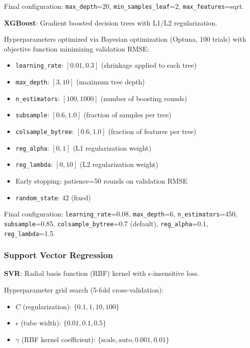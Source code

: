 \documentclass[11pt]{article}
\begin{document}
Final configuration: \texttt{max\_depth}=20, \texttt{min\_samples\_leaf}=2, \texttt{max\_features}=sqrt.

\textbf{XGBoost}: Gradient boosted decision trees with L1/L2 regularization.

Hyperparameters optimized via Bayesian optimization (Optuna, 100 trials) with objective function minimizing validation RMSE:
\begin{itemize}
    \item \texttt{learning\_rate}: $[0.01, 0.3]$ (shrinkage applied to each tree)
    \item \texttt{max\_depth}: $[3, 10]$ (maximum tree depth)
    \item \texttt{n\_estimators}: $[100, 1000]$ (number of boosting rounds)
    \item \texttt{subsample}: $[0.6, 1.0]$ (fraction of samples per tree)
    \item \texttt{colsample\_bytree}: $[0.6, 1.0]$ (fraction of features per tree)
    \item \texttt{reg\_alpha}: $[0, 1]$ (L1 regularization weight)
    \item \texttt{reg\_lambda}: $[0, 10]$ (L2 regularization weight)
    \item Early stopping: patience=50 rounds on validation RMSE
    \item \texttt{random\_state}: 42 (fixed)
\end{itemize}

Final configuration: \texttt{learning\_rate}=0.08, \texttt{max\_depth}=6, \texttt{n\_estimators}=450, \texttt{subsample}=0.85, \texttt{colsample\_bytree}=0.7 (default), \texttt{reg\_alpha}=0.1, \texttt{reg\_lambda}=1.5.

\subsubsection*{Support Vector Regression}

\textbf{SVR}: Radial basis function (RBF) kernel with $\epsilon$-insensitive loss.

Hyperparameter grid search (5-fold cross-validation):
\begin{itemize}
    \item $C$ (regularization): $\{0.1, 1, 10, 100\}$
    \item $\epsilon$ (tube width): $\{0.01, 0.1, 0.5\}$
    \item $\gamma$ (RBF kernel coefficient): $\{\text{scale}, \text{auto}, 0.001, 0.01\}$
\end{itemize}
\end{document}
